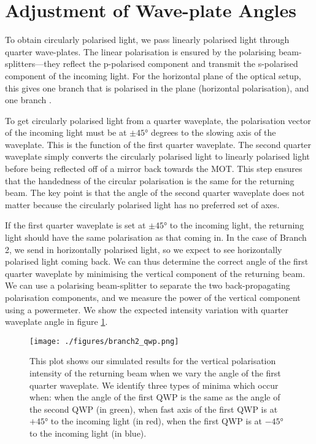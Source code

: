 \documentclass[12pt,twoside]{article}
\begin{document}
\section{Adjustment of Wave-plate Angles}
\hspace{10pt} To obtain circularly polarised light, we pass linearly polarised light through quarter wave-plates. The linear polarisation is ensured by the polarising beam-splitters---they reflect the p-polarised component and transmit the s-polarised component of the incoming light. For the horizontal plane of the optical setup, this gives one branch that is polarised in the plane (horizontal polarisation), and one branch . 

To get circularly polarised light from a quarter waveplate, the polarisation vector of the incoming light must be at $\pm45°$ degrees to the slowing axis of the waveplate. This is the function of the first quarter waveplate. The second quarter waveplate simply converts the circularly polarised light to linearly polarised light before being reflected off of a mirror back towards the MOT. This step ensures that the handedness of the circular polarisation is the same for the returning beam. The key point is that the angle of the second quarter waveplate does not matter because the circularly polarised light has no preferred set of axes. 

If the first quarter waveplate is set at $\pm45°$  to the incoming light, the returning light should have the same polarisation as that coming in. In the case of Branch 2, we send in horizontally polarised light, so we expect to see horizontally polarised light coming back. We can thus determine the correct angle of the first quarter waveplate by minimising the vertical component of the returning beam. We can use a polarising beam-splitter to separate the two back-propagating polarisation components, and we measure the power of the vertical component using a powermeter. We show the expected intensity variation with quarter waveplate angle in figure \ref{fig:waveplate_intensity}.

\begin{figure}[h]
    \centering
    \texttt{[image: ./figures/branch2\_qwp.png]}
    \caption{This plot shows our simulated results for the vertical polarisation intensity of the returning beam when we vary the angle of the first quarter waveplate. We identify three types of minima which occur when: when the angle of the first QWP is the same as the angle of the second QWP (in green), when fast axis of the first QWP is at $+45$° to the incoming light (in red), when the first QWP is at $-45$° to the incoming light (in blue).}
    \label{fig:waveplate_intensity}
\end{figure}
\end{document}
